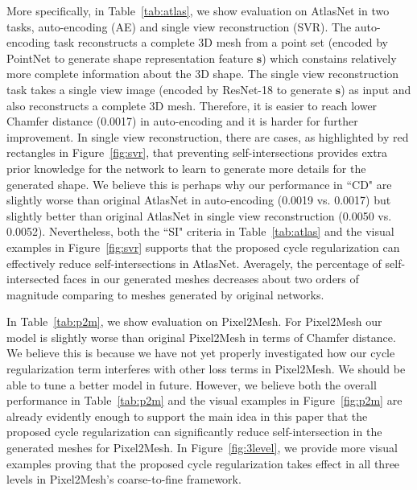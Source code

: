 More specifically, in Table~\ref{tab:atlas}, we show evaluation on AtlasNet in two tasks, auto-encoding (AE) and single view reconstruction (SVR). The auto-encoding task reconstructs a complete 3D mesh from a point set (encoded by PointNet\cite{pointnet} to generate shape representation feature $\mathbf{s}$) which constains relatively more complete information about the 3D shape. The single view reconstruction task takes a single view image (encoded by ResNet-18 \cite{resnet} to generate $\mathbf{s}$) as input and also reconstructs a complete 3D mesh. Therefore, it is easier to reach lower Chamfer distance (0.0017) in auto-encoding and it is harder for further improvement.  In single view reconstruction, there are cases, as highlighted by red rectangles in Figure~\ref{fig:svr}, that preventing self-intersections provides extra prior knowledge for the network to learn to generate more details for the generated shape. We believe this is perhaps why our performance in ``CD"  are slightly worse than original AtlasNet in auto-encoding (0.0019 vs. 0.0017) but slightly better than original AtlasNet in single view reconstruction (0.0050 vs. 0.0052). Nevertheless, both the ``SI" criteria in Table~\ref{tab:atlas} and the visual examples in Figure~\ref{fig:svr} supports that the proposed cycle regularization can effectively reduce self-intersections in AtlasNet. Averagely, the percentage of self-intersected faces in our generated meshes decreases about two orders of magnitude comparing to meshes generated by original networks.

In Table~\ref{tab:p2m}, we show evaluation on Pixel2Mesh. For Pixel2Mesh our model is slightly worse than original Pixel2Mesh in terms of Chamfer distance. We believe this is because we have not yet properly investigated how our cycle regularization term interferes with other loss terms in Pixel2Mesh. We should be able to tune a better model in future. However, we believe both the overall performance in Table~\ref{tab:p2m} and the visual examples in Figure~\ref{fig:p2m} are already evidently enough to support the main idea in this paper that the proposed cycle regularization can significantly reduce self-intersection in the generated meshes for Pixel2Mesh. In Figure~\ref{fig:3level}, we provide more visual examples proving that the proposed cycle regularization takes effect in all three levels in Pixel2Mesh's coarse-to-fine framework.

